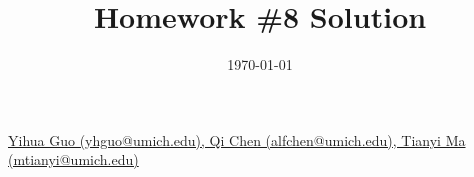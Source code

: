 \documentclass{amsart}
\theoremstyle{definition}
\theoremstyle{remark}
\numberwithin{equation}{section}
\begin{document}
\title{Homework \#8 Solution}
	
\date{\today}

\maketitle

 \href{mailto:yhguo@umich.edu,alfchen@umich.edu,mtianyi@umich.edu}
{Yihua Guo (yhguo@umich.edu), 
Qi Chen (alfchen@umich.edu),
Tianyi Ma (mtianyi@umich.edu)}

\bigskip


%







\end{document}
